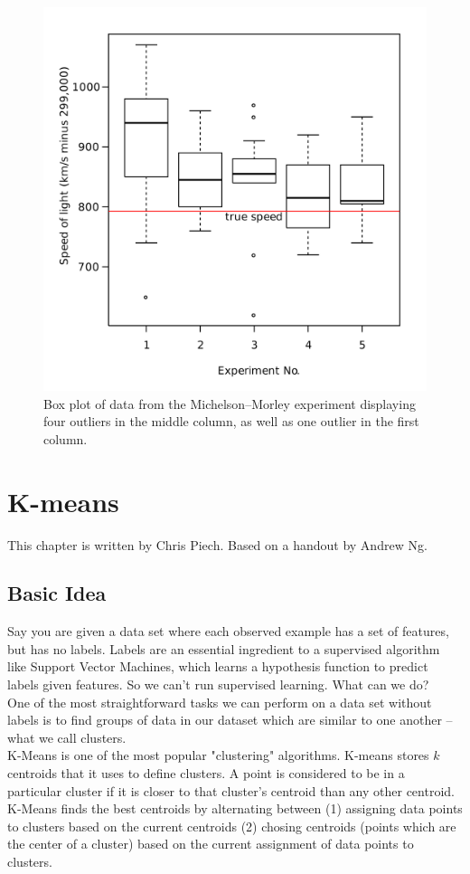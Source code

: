 \documentclass[10pt,letterpaper]{article}
\begin{document}
\begin{figure}[H]
\includegraphics[width=.3\textwidth]{2560px-Michelsonmorley-boxplot.svg.png}
\centering
\caption{ Box plot of data from the Michelson–Morley experiment displaying four outliers in the middle column, as well as one outlier in the first column.}
\label{figure4}
\end{figure}

\section{K-means}
This chapter is written by Chris Piech. Based on a handout by Andrew Ng.
\subsection{Basic Idea}
Say you are given a data set where each observed example has a set of features, but has no labels. Labels are an essential ingredient to a supervised algorithm like Support Vector Machines, which learns a hypothesis function to predict labels given features. So we can't run supervised learning. What can we do? \\

One of the most straightforward tasks we can perform on a data set without labels is to find groups of data in our dataset which are similar to one another -- what we call clusters.\\

K-Means is one of the most popular "clustering" algorithms. K-means stores $k$ centroids that it uses to define clusters. A point is considered to be in a particular cluster if it is closer to that cluster's centroid than any other centroid.\\

K-Means finds the best centroids by alternating between (1) assigning data points to clusters based on the current centroids (2) chosing centroids (points which are the center of a cluster) based on the current assignment of data points to clusters.\\
\end{document}
